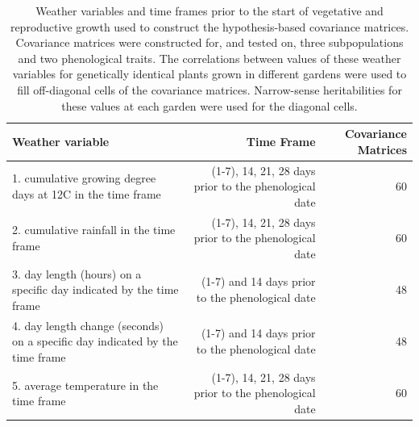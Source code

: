 \documentclass[
  9pt,
  twocolumn,
  twoside]{pnas-new}
\begin{document}
\clearpage
\onecolumn
\begin{table}[t!]
\centering
\caption{Weather variables and time frames prior to the start of vegetative and reproductive growth used to construct the hypothesis-based covariance matrices. Covariance matrices were constructed for, and tested on, three subpopulations and two phenological traits. The correlations between values of these weather variables for genetically identical plants grown in different gardens were used to fill off-diagonal cells of the covariance matrices. Narrow-sense heritabilities for these values at each garden were used for the diagonal cells.}
\begin{tabular}{lrr}
Weather variable & Time Frame & Covariance Matrices \\
\midrule
1. cumulative growing degree days at 12C in the time frame & (1-7), 14, 21, 28 days prior to the phenological date & 60 \\
2. cumulative rainfall in the time frame & (1-7), 14, 21, 28 days prior to the phenological date & 60  \\
3. day length (hours) on a specific day indicated by the time frame & (1-7) and 14 days prior to the phenological date & 48 \\
4. day length change (seconds) on a specific day indicated by the time frame & (1-7) and 14 days prior to the phenological date & 48 \\
5. average temperature in the time frame & (1-7), 14, 21, 28 days prior to the phenological date & 60 \\
\bottomrule
\end{tabular}

\end{table}
\clearpage
\twocolumn
\end{document}
